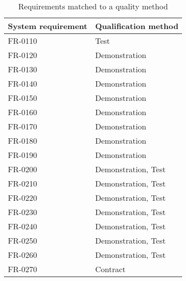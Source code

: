 \begin{table}[H]
\begin{tabular}{|l|l|}
\hline
 \textbf{System requirement} & \textbf{Qualification method} \\ \hline
 FR-0110 & Test \\  \hline
 FR-0120 & Demonstration \\  \hline
 FR-0130 & Demonstration \\  \hline
 FR-0140 & Demonstration \\  \hline
 FR-0150 & Demonstration \\  \hline
 FR-0160 & Demonstration \\  \hline
 FR-0170 & Demonstration  \\  \hline
 FR-0180 & Demonstration \\  \hline
 FR-0190 & Demonstration  \\  \hline
 FR-0200 & Demonstration, Test  \\  \hline
 FR-0210 & Demonstration, Test \\  \hline
 FR-0220 & Demonstration, Test \\  \hline
 FR-0230 & Demonstration, Test \\  \hline
 FR-0240 & Demonstration, Test \\  \hline
 FR-0250 & Demonstration, Test \\  \hline
 FR-0260 & Demonstration, Test \\  \hline               
 FR-0270 & Contract \\  \hline
\end{tabular}
\caption{Requirements matched to a quality method}
\end{table}